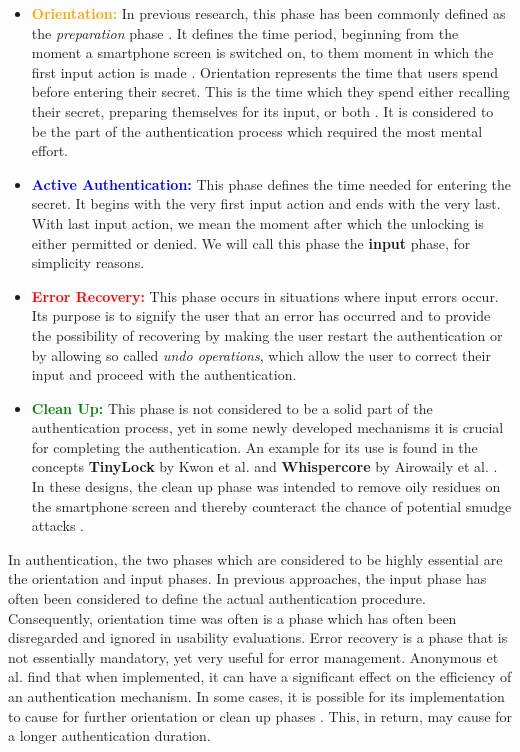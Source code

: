 \begin{itemize}
    \item \textbf{\textcolor{orange}{Orientation:}} In previous research, this phase has been commonly defined as the \textit{preparation} phase \cite{anonymous}. It defines the time period, beginning from the moment a smartphone screen is switched on, to them moment in which the first input action is made \cite{anonymous}. Orientation represents the time that users spend before entering their secret. This is the time which they spend either recalling their secret, preparing themselves for its input, or both \cite{anonymous}. It is considered to be the part of the authentication process which required the most mental effort.  
    \item \textbf{\textcolor{blue}{Active Authentication:}} This phase defines the time needed for entering the secret. It begins with the very first input action and ends with the very last. With last input action, we mean the moment after which the unlocking is either permitted or denied. We will call this phase the \textbf{input} phase, for simplicity reasons.
    \item \textbf{\textcolor{red}{Error Recovery:}} This phase occurs in situations where input errors occur. Its purpose is to signify the user that an error has occurred and to provide the possibility of recovering by making the user restart the authentication or by allowing so called \textit{undo operations}, which allow the user to correct their input and proceed with the authentication. 
    \item \textbf{\textcolor{green}{Clean Up:}} This phase is not considered to be a solid part of the authentication process, yet in some newly developed mechanisms it is crucial for completing the authentication. An example for its use is found in the concepts \textbf{TinyLock} by Kwon et al. \cite{kwon} and \textbf{Whispercore} by Airowaily et al. \cite{Airowaily}. In these designs, the clean up phase was intended to remove oily residues on the smartphone screen and thereby counteract the chance of potential smudge attacks \cite{anonymous}. 
\end{itemize}

In authentication, the two phases which are considered to be highly essential are the orientation and input phases. In previous approaches, the input phase has often been considered to define the actual authentication procedure. Consequently, orientation time was often is a phase which has often been disregarded and ignored in usability evaluations. Error recovery is a phase that is not essentially mandatory, yet very useful for error management. Anonymous et al. \cite{anonymous} find that when implemented, it can have a significant effect on the efficiency of an authentication mechanism. In some cases, it is possible for its implementation to cause for further orientation or clean up phases \cite{anonymous}. This, in return, may cause for a longer authentication duration.
